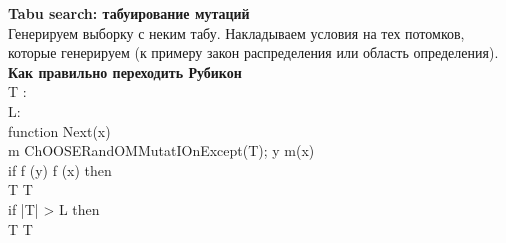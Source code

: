\textbf{Tabu search: табуирование мутаций} \\ 
Генерируем выборку с неким табу. Накладываем условия на тех потомков, которые генерируем (к примеру закон распределения или область определения). \\
\textbf{Как правильно переходить Рубикон} \\
T \leftarrow \lbrace \rbrace:  \\
L:  \\
function Next(x)  \\
\tab m \leftarrow ChOOSERandOMMutatIOnExcept(T); y \leftarrow m(x)  \\
\tab if f (y) \ge f (x) then  \\
\tab \tab T \leftarrow T  \\ 
\tab \tab if |T| > L then \\ 
\tab \tab \tab T \leftarrow T   \\
\tab \tab {}  \\
\tab \tab {}  \\
\tab {}  \\
\tab {}  \\
  \\

